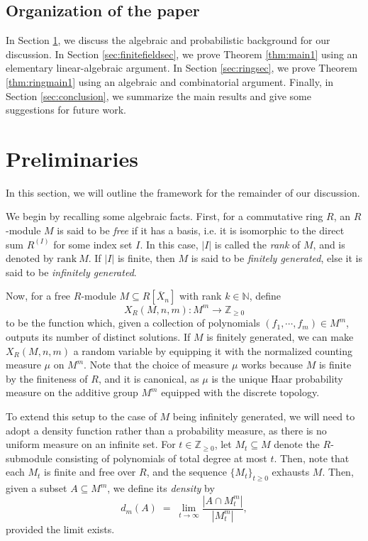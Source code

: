 \documentclass[12pt]{amsart}
\theoremstyle{definition}
\newcommand{\NN}{\mathbb{N} }
\newcommand{\ZZ}{\mathbb{Z} }
\begin{document}
\subsection{Organization of the paper} In Section \ref{sec:prelim}, we discuss the algebraic and probabilistic background for our discussion. In Section \ref{sec:finitefieldsec}, we prove Theorem \ref{thm:main1} using an elementary linear-algebraic argument. In Section \ref{sec:ringsec}, we prove Theorem \ref{thm:ringmain1} using an algebraic and combinatorial argument. Finally, in Section \ref{sec:conclusion}, we summarize the main results and give some suggestions for future work.

\section{Preliminaries}\label{sec:prelim}

In this section, we will outline the framework for the remainder of our discussion. 

We begin by recalling some algebraic facts. First, for a commutative ring $R$, an $R$-module $M$ is said to be \emph{free} if it has a basis, i.e. it is isomorphic to the direct sum $R^{(I)}$ for some index set $I$. In this case, $|I|$ is called the \emph{rank} of $M$, and is denoted by $\mathrm{rank} \ M$. If $|I|$ is finite, then $M$ is said to be \emph{finitely generated}, else it is said to be \emph{infinitely generated}.

Now, for a free $R$-module $M \subseteq R[\overline{X}_n]$ with rank $k \in \NN$, define 
\begin{equation}\label{eqn:X(M,n,m)}
X_R(M,n,m): M^m \to \ZZ_{\ge 0}
\end{equation} 
to be the function which, given a collection of polynomials $(f_1, \cdots , f_m) \in M^m$, outputs its number of distinct solutions. If $M$ is finitely generated, we can make $X_R(M,n,m)$ a random variable by equipping it with the normalized counting measure $\mu$ on $M^m$. Note that the choice of measure $\mu$ works because $M$ is finite by the finiteness of $R$, and it is canonical, as $\mu$ is the unique Haar probability measure on the additive group $M^m$ equipped with the discrete topology.

To extend this setup to the case of $M$ being infinitely generated, we will need to adopt a density function rather than a probability measure, as there is no uniform measure on an infinite set. For $t \in \ZZ_{\ge 0}$, let $M_t \subseteq M$ denote the $R$-submodule consisting of polynomials of total degree at most $t$. Then, note that each $M_t$ is finite and free over $R$, and the sequence $\{M_t\}_{t\ge 0}$ exhausts $M$. Then, given a subset $A \subseteq M^m$, we define its \emph{density} by
\begin{equation}\label{eq:mdensity}
d_m(A)
\;=\;
\lim_{t\to\infty}
\frac{|A \cap M_t^m|}{|M_t^m|},
\end{equation}
provided the limit exists.
\end{document}
